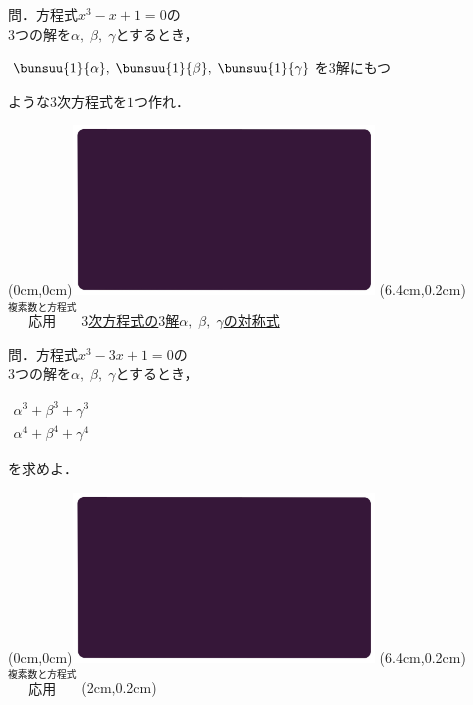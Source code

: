 \documentclass[10pt,
fleqn,
dvipdfmx,
uplatex
]{jsarticle}
\begin{document}
\large
問．方程式$x^3-x+1=0$の\\
\hfill $3$つの解を$\alpha ,\;\beta ,\;\gamma$とするとき，

\LARGE 
\vspace{0.2zw}
\hspace{0.5zw}$\bunsuu{1}{\alpha },\;\bunsuu{1}{\beta },\;\bunsuu{1}{\gamma}$を$3$解にもつ\vspace{0.2zw}

\large
\hfill ような$3$次方程式を$1$つ作れ．


\newpage



\at(0cm,0cm){\includegraphics[width=8cm,bb=0 0 1920 1080]{./youtube/thumbnails/templates/smart_background/複素数と方程式.jpeg}}
\at(6.4cm,0.2cm){\small\color{bradorange}$\overset{\text{複素数と方程式}}{\text{応用}}$}
{\color{orange}\large\underline{$3$次方程式の$3$解$\alpha ,\;\beta ,\;\gamma$の対称式}}\vspace{0.3zw}

\large
問．方程式$x^3-3x+1=0$の\\
\hfill $3$つの解を$\alpha ,\;\beta ,\;\gamma$とするとき，

\huge
\vspace{0.3zw}
\hspace{0.1zw}
$\begin{array}{l}\alpha ^3+\beta ^3+\gamma^3\;\\
\alpha ^4+\beta ^4+\gamma^4
\end{array}$

\large
\vspace{-1.5zw}
\hfill を求めよ．


\newpage



\at(0cm,0cm){\includegraphics[width=8cm,bb=0 0 1920 1080]{./youtube/thumbnails/templates/smart_background/複素数と方程式.jpeg}}
\at(6.4cm,0.2cm){\small\color{bradorange}$\overset{\text{複素数と方程式}}{\text{応用}}$}
\at(2cm,0.2cm){\color{orange}\LARGE\underline{}}\vspace{0.3zw}
\end{document}
